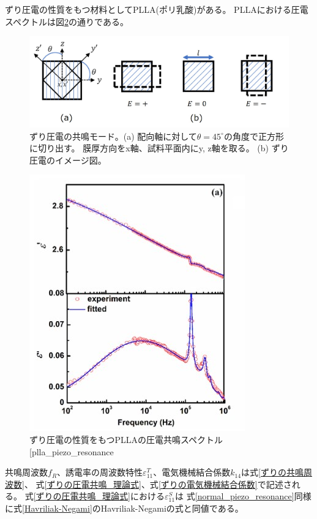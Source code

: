 \documentclass[dvipdfmx,12pt,a4paper]{jreport}
\makeatletter
\DeclareRobustCommand\cite{\unskip
    	\@ifnextchar[{\@tempswatrue\@citex}{\@tempswafalse\@citex[]}}
\makeatother
\begin{document}
			ずり圧電の性質をもつ材料としてPLLA(ポリ乳酸)がある。
			PLLAにおける圧電スペクトルは図\ref{PLLA_piezo_resonance}の通りである。
			\begin{figure}[h]
				\centering
				\includegraphics[width=0.8\linewidth]{ずり圧電_共鳴モード.jpg}
				\caption{ずり圧電の共鳴モード。(a) 配向軸に対して$\theta=45^\circ$の角度で正方形に切り出す。
				膜厚方向をx軸、試料平面内にy, z軸を取る。
				(b) ずり圧電のイメージ図。}
				\label{ずり圧電の共鳴モード}
			\end{figure}
			\begin{figure}[h]
				\centering
				\includegraphics{PLLA_圧電共鳴スペクトル.jpg}
				\caption{ずり圧電の性質をもつPLLAの圧電共鳴スペクトル\cite{plla_piezo_resonance}}
				\label{PLLA_piezo_resonance}
			\end{figure}
			共鳴周波数$f_R$、誘電率の周波数特性$\varepsilon_{11}^T$、電気機械結合係数$k_{14}$は式\eqref{ずりの共鳴周波数}、
			式\eqref{ずりの圧電共鳴_理論式}、式\eqref{ずりの電気機械結合係数}で記述される。
			式\eqref{ずりの圧電共鳴_理論式}における$\varepsilon_{11}^S$は
			式\eqref{normal_piezo_resonance}同様に式\eqref{Havriliak-Negami}のHavriliak-Negamiの式と同値である。
\end{document}
